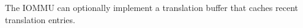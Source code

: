 \documentclass[12pt]{article}
\begin{document}
The IOMMU can optionally implement a translation buffer that caches recent translation
entries. 












\end{document}
